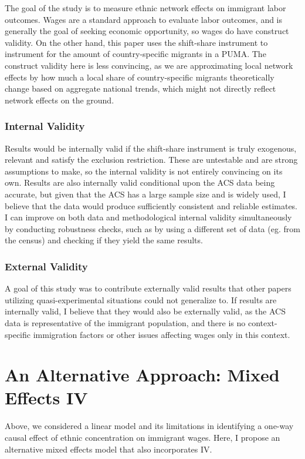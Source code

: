 \documentclass[11pt]{article}
\begin{document}
The goal of the study is to measure ethnic network effects on immigrant labor outcomes. Wages are a standard approach to evaluate labor outcomes, and is generally the goal of seeking economic opportunity, so wages do have construct validity. On the other hand, this paper uses the shift-share instrument to instrument for the amount of country-specific migrants in a PUMA. The construct validity here is less convincing, as we are approximating local network effects by how much a local share of country-specific migrants theoretically change based on aggregate national trends, which might not directly reflect network effects on the ground. 

\subsubsection{Internal Validity}
Results would be internally valid if the shift-share instrument is truly exogenous, relevant and satisfy the exclusion restriction. These are untestable and are strong assumptions to make, so the internal validity is not entirely convincing on its own.  Results are also internally valid conditional upon the ACS data being accurate, but given that the ACS has a large sample size and is widely used, I believe that the data would produce sufficiently consistent and reliable estimates. I can improve on both data and methodological internal validity simultaneously by conducting robustness checks, such as by using a different set of data (eg. from the census) and checking if they yield the same results.

\subsubsection{External Validity}

A goal of this study was to contribute externally valid results that other papers utilizing quasi-experimental situations could not generalize to. If results are internally valid, I believe that they would also be externally valid, as the ACS data is representative of the immigrant population, and there is no context-specific immigration factors or other issues affecting wages only in this context. 


\section{An Alternative Approach: Mixed Effects IV}
Above, we considered a linear model and its limitations in identifying a one-way causal effect of ethnic concentration on immigrant wages. Here, I propose an alternative mixed effects model that also incorporates IV. 
\end{document}
